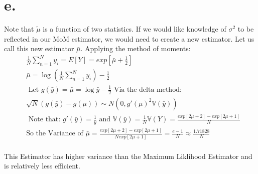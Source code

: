\documentclass{paper}
\begin{document}
\section*{e.}
Note that $\widetilde{ \mu }$ is a function of two statistics. If we would like knowledge of $\sigma^2$ to be reflected in our MoM estimator, we would need to create a new estimator. Let us call this new estimator $\bar{\mu}$.
Applying the method of moments:
\begin{equation*}
\begin{alignedat}{2}
& \frac{1}{N} \sum_{n=1}^N y_i = E[Y] = exp[ \bar{\mu} + \frac{1}{2} ]\\
& \bar{\mu} = \log( \frac{1}{N} \sum_{n=1}^N y_i ) - \frac{1}{2}\\
&\text{ Let }g( \bar{y} ) = \bar{\mu} = \log{ \bar{y} } - \frac{1}{2} \text{ Via the delta method: }\\
&\sqrt{N}( g( \bar{y} ) - g( \mu ) ) \sim N( 0, g'( \mu )^2 \mathbb{V}(\bar{y} ) )\\
&\text{ Note that: }g'(\bar{y}) = \frac{1}{\bar{y}}\text{ and } \mathbb{V}(\bar{y}) = \frac{1}{N} \mathbb{V}( Y) = \frac{ exp[2 \mu + 2] - exp[2 \mu + 1]}{N} \\
&\text{So the Variance of } \bar{ \mu } = \frac{ exp[2 \mu + 2] - exp[2 \mu + 1]}{N exp[ 2\mu +1] } = \frac{ e - 1 }{N} \approx \frac{1.71828}{N}\\
\end{alignedat}
\end{equation*}

This Estimator has higher variance than the Maximum Liklihood Estimator and is relatively less efficient.



\end{document}
